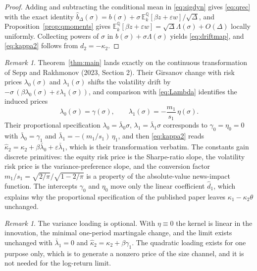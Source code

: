 \documentclass[11pt]{article}
\theoremstyle{remark}
\newtheorem{remark}[theorem]{Remark}
\newcommand{\E}{\mathbb{E}}
\newcommand{\Qm}{\mathbb{Q}}
\newcommand{\Dt}{\Delta}
\begin{document}
\begin{proof}
Adding and subtracting the conditional mean in \eqref{eq:sigdyn} gives
\eqref{eq:qrec} with the exact identity
$\hat b_{\Dt}(\sigma)=b(\sigma)
+\sigma\,\E^{\Qm}_k[\beta z+\varepsilon w]/\sqrt{\Dt}$, and
Proposition~\ref{prop:qmoments} gives
$\E^{\Qm}_k[\beta z+\varepsilon w]
=\sqrt{\Dt}\Lambda(\sigma)+O(\Dt)$ locally uniformly.
Collecting powers of $\sigma$ in $b(\sigma)+\sigma\Lambda(\sigma)$ yields
\eqref{eq:driftmap}, and \eqref{eq:kappa2} follows from $d_2=-\kappa_2$.
\end{proof}

\begin{remark}\label{rem:match}
Theorem~\ref{thm:main} lands exactly on the continuous transformation of
Sepp and Rakhmonov (2023, Section 2).
Their Girsanov change with risk prices $\lambda_0(\sigma)$ and
$\lambda_1(\sigma)$ shifts the volatility drift by
$-\sigma\,(\beta\lambda_0(\sigma)+\varepsilon\lambda_1(\sigma))$, and
comparison with \eqref{eq:Lambda} identifies the induced prices
\begin{equation}\label{eq:prices}
\lambda_0(\sigma)=\gamma(\sigma),
\qquad
\lambda_1(\sigma)=-\frac{m_1}{s_1}\,\eta(\sigma).
\end{equation}
Their proportional specification
$\lambda_0=\bar\lambda_0\sigma$, $\lambda_1=\bar\lambda_1\sigma$
corresponds to $\gamma_0=\eta_0=0$ with $\bar\lambda_0=\gamma_1$ and
$\bar\lambda_1=-(m_1/s_1)\,\eta_1$, and then \eqref{eq:kappa2} reads
$\hat\kappa_2=\kappa_2+\beta\bar\lambda_0+\varepsilon\bar\lambda_1$, which
is their transformation verbatim.
The constants gain discrete primitives: the equity risk price is the
Sharpe-ratio slope, the volatility risk price is the variance-preference
slope, and the conversion factor $m_1/s_1=\sqrt{2/\pi}/\sqrt{1-2/\pi}$ is a
property of the absolute-value news-impact function.
The intercepts $\gamma_0$ and $\eta_0$ move only the linear coefficient
$\hat d_1$, which explains why the proportional specification of the
published paper leaves $\kappa_1-\kappa_2\theta$ unchanged.
\end{remark}

\begin{remark}\label{rem:esscher}
The variance loading is optional.
With $\eta\equiv0$ the kernel is linear in the innovation, the minimal
one-period martingale change, and the limit exists unchanged with
$\bar\lambda_1=0$ and $\hat\kappa_2=\kappa_2+\beta\gamma_1$.
The quadratic loading exists for one purpose only, which is to generate a
nonzero price of the size channel, and it is not needed for the log-return
limit.
\end{remark}
\end{document}
